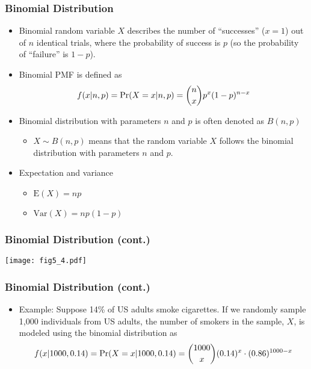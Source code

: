 \documentclass[pdflatex, 12pt]{beamer}
\begin{document}
\begin{frame}
\frametitle{Binomial Distribution}
\begin{itemize}
\item Binomial random variable $X$ describes the number of ``successes'' ($x = 1$) out of $n$ identical trials, where the probability of success is $p$ (so the probability of ``failure'' is $1 - p$).
\vspace{0.3cm}
\item Binomial PMF is defined as
 \begin{equation}
 f(x|n, p) = \Pr(X = x|n, p) = \binom{n}{x} p^x (1 - p)^{n - x} \notag
 \end{equation}
\vspace{0.1cm}
\item Binomial distribution with parameters $n$ and $p$ is often denoted as $B(n, p)$
 \begin{itemize}
 \item $X \sim B(n, p)$ means that the random variable $X$ follows the binomial distribution with parameters $n$ and $p$.
 \end{itemize}
\vspace{0.3cm}
\item Expectation and variance
 \begin{itemize}
 \item $\mathrm{E}(X) = np$
 \item $\mathrm{Var}(X) = np(1 - p)$
 \end{itemize}
\end{itemize}
\end{frame}

\begin{frame}
\frametitle{Binomial Distribution (cont.)}
\centering
\texttt{[image: fig5\_4.pdf]}
\end{frame}

\begin{frame}
\frametitle{Binomial Distribution (cont.)}
\begin{itemize}
\item Example: Suppose 14\% of US adults smoke cigarettes. If we randomly sample 1,000 individuals from US adults, the number of smokers in the sample, $X$, is modeled using the binomial distribution as
 {\footnotesize
 \begin{equation}
 f(x|1000, 0.14) = \Pr(X = x|1000, 0.14) = \binom{1000}{x} (0.14)^x \cdot (0.86)^{1000 - x} \notag
 \end{equation}
 }
\end{itemize}
\end{frame}
\end{document}
